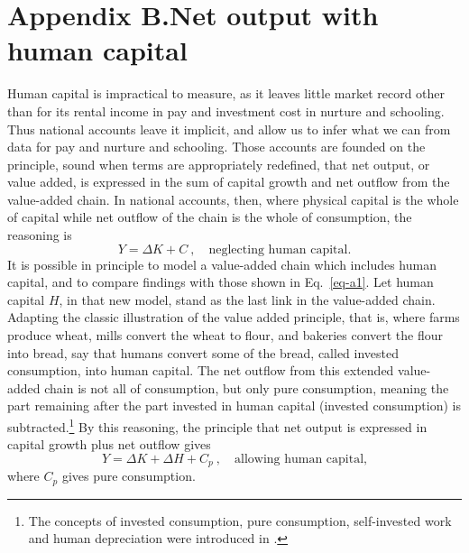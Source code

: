 \documentclass[a4padisinvitingper,fleqn]{latex_styles/cas-sc}
\begin{document}
\hypertarget{appendix-b}{%
\section*{Appendix B.\hspace{0.5em}Net output with human
capital}\label{appendix-b}}

Human capital is impractical to measure, as it leaves little market
record other than for its rental income in pay and investment cost in nurture and schooling. Thus national accounts
leave it implicit, and allow us to infer what we can from data for pay and nurture and schooling. Those
accounts are founded on the principle, sound when terms are appropriately redefined, that net output,
or value added, is expressed in the sum of capital growth and net
outflow from the value-added chain. In national accounts, then, where
physical capital is the whole of capital while net outflow of the chain
is the whole of consumption, the reasoning is
%
\begin{equation}
Y = \Delta K + C \ , \quad \text{neglecting human capital.}\label{eq-a1}
\end{equation}
%
It is possible in principle to model a value-added chain which includes human
capital, and to compare findings with those shown in Eq.~\eqref{eq-a1}.
Let human capital $H$, in that new model, stand as the last link in the
value-added chain. Adapting the classic illustration of the value added
principle, that is, where farms produce wheat, mills convert the wheat to
flour, and bakeries convert the flour into bread, say that humans convert some of
the bread, called invested consumption, into human capital. The net
outflow from this extended value-added chain is not all of consumption,
but only pure consumption, meaning the part remaining after the part invested in human capital (invested consumption) is
subtracted.\footnote{The concepts of invested consumption, pure consumption, self-invested work and human depreciation were introduced in \cite{schultzInvestmentHumanCapital1961}.} By this reasoning, the principle
that net output is expressed in capital growth plus net outflow gives
%
\begin{equation} 
Y = \Delta K + \Delta H + C_{p}\ , \quad \text{allowing human capital,}\label{eq-a2} 
\end{equation}
%
where \(C_{p}\) gives pure consumption.
\end{document}
